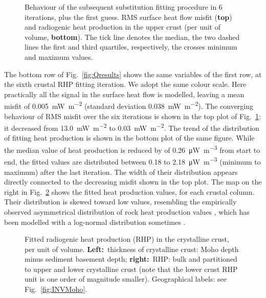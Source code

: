 {\begin{figure}
	\begin{adjustbox}{center}
	\end{adjustbox}
	\caption{Behaviour of the subsequent substitution fitting procedure in 6 iterations, plus the first guess. RMS surface heat flow misfit (\textbf{top}) and radiogenic heat production in the upper crust (per unit of volume, \textbf{bottom}). The tick line denotes the median, the two dashed lines the first and third quartiles, respectively, the crosses minimum and maximum values.}
	\label{fig:RMSvsITN}
\end{figure}

The bottom row of Fig.~\ref{fig:Qresults} shows the same variables of the first row, at the sixth crustal RHP fitting iteration.
We adopt the same colour scale.
Here practically all the signal in the surface heat flow is modelled, leaving a mean misfit of 0.005~\si{\milli \watt \per \square \metre} (standard deviation 0.038~\si{\milli \watt \per \square \metre}).
The converging behaviour of RMS misfit over the six iterations is shown in the top plot of Fig.~\ref{fig:RMSvsITN}: it decreased from 13.0~\si{\milli \watt \per \square \metre} to 0.03~\si{\milli \watt \per \square \metre}.
The trend of the distribution of fitting heat production is shown in the bottom plot of the same figure.
While the median value of heat production is reduced by of \SI{0.26}{\micro \watt \per \cubic \metre} from start to end, the fitted values are distributed between \num{0.18} to \SI{2.18}{\micro \watt \per \cubic \metre} (minimum to maximum) after the last iteration.
The width of their distribution appears directly connected to the decreasing misfit shown in the top plot.
The map on the right in Fig.~\ref{fig:Aresults} shows the fitted heat production values, for each crustal column.
Their distribution is skewed toward low values, resembling the empirically observed asymmetrical distribution of rock heat production values \parencites{Vila2010}{Artemieva2017granite}{Hasterok2017_ign}, which has been modelled with a log-normal distribution sometimes \parencites[e.g. ][]{Jokinen1999}{Huang2013}.

\begin{figure}
	\begin{adjustbox}{center}
	\end{adjustbox}
	\caption{Fitted radiogenic heat production (RHP) in the crystalline crust, per unit of volume. \textbf{Left:}~thickness of crystalline crust: Moho depth minus sediment basement depth; \textbf{right:}~RHP: bulk and partitioned to upper and lower crystalline crust (note that the lower crust RHP unit is one order of magnitude smaller). Geographical labels: see Fig.~\ref{fig:INVMoho}.}
	\label{fig:Aresults}
\end{figure}

}
